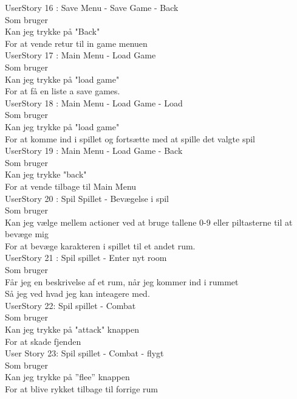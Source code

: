UserStory 16 : Save Menu - Save Game - Back\\
  Som bruger \\
  Kan jeg trykke på "Back"\\
  For at vende retur til in game menuen\\
  
UserStory 17 : Main Menu - Load Game\\
  Som bruger \\
  Kan jeg trykke på "load game" \\
  For at få en liste a save games.\\

UserStory 18 : Main Menu - Load Game - Load\\
  Som bruger \\
  Kan jeg trykke på "load game" \\
  For at komme ind i spillet og fortsætte med at spille det valgte spil\\

UserStory 19 : Main Menu - Load Game - Back\\
  Som bruger \\
  Kan jeg trykke "back" \\
  For at vende tilbage til Main Menu\\
  
UserStory 20 : Spil Spillet - Bevægelse i spil\\
  Som bruger \\
  Kan jeg vælge mellem actioner ved at bruge tallene 0-9 eller piltasterne til at bevæge mig\\
  For at bevæge karakteren i spillet til et andet rum.\\

UserStory 21 : Spil spillet - Enter nyt room\\
  Som bruger \\
  Får jeg en beskrivelse af et rum, når jeg kommer ind i rummet\\
  Så jeg ved hvad jeg kan inteagere med.\\
  
UserStory 22: Spil spillet - Combat\\
  Som bruger\\
  Kan jeg trykke på "attack" knappen\\
  For at skade fjenden\\

User Story 23: Spil spillet - Combat - flygt\\
Som bruger\\
Kan jeg trykke på ”flee” knappen\\
For at blive rykket tilbage til forrige rum\\
  
